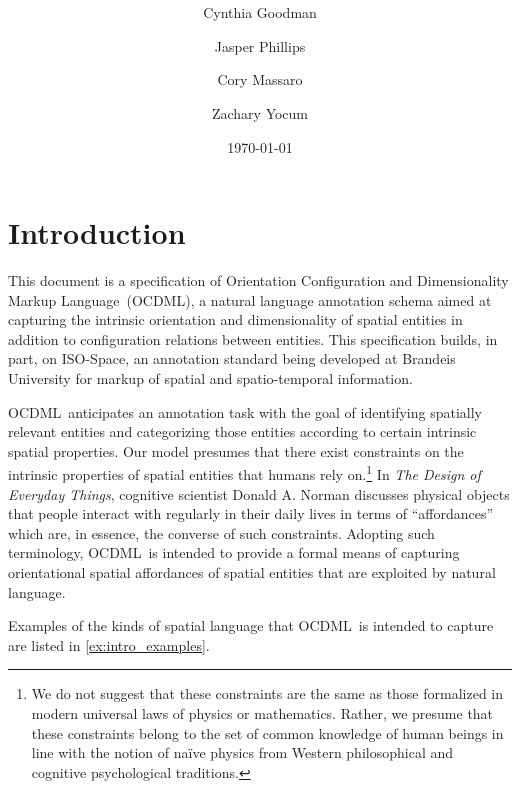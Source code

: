 \documentclass[11pt]{article}
\title{\nameML\\
{\Large \version}}
\author{
    Cynthia Goodman\\
    \and
    Jasper Phillips\\
    \and
    Cory Massaro\\
    \and
    Zachary Yocum\\
}
\date{\today}
\newcommand{\nameML}{Orientation Configuration and Dimensionality Markup Language}
\newcommand{\ML}{OCDML}
\begin{document}
\maketitle

\tableofcontents 

\newpage

\section{Introduction} %
\label{sec:introduction}

This document is a specification of \nameML~(\ML), a natural language annotation schema aimed at capturing the intrinsic orientation and dimensionality of spatial entities in addition to configuration relations between entities. This specification builds, in part, on ISO-Space\cite{pustejovsky_moszkowicz:2011}, an annotation standard being developed at Brandeis University for markup of spatial and spatio-temporal information.

\ML~anticipates an annotation task with the goal of identifying spatially relevant entities and categorizing those entities according to certain intrinsic spatial properties. Our model presumes that there exist constraints on the intrinsic properties of spatial entities that humans rely on.\footnote{We do not suggest that these constraints are the same as those formalized in modern universal laws of physics or mathematics. Rather, we presume that these constraints belong to the set of common knowledge of human beings in line with the notion of na\"ive physics from Western philosophical and cognitive psychological traditions.} In \emph{The Design of Everyday Things}\cite{norman:2002}, cognitive scientist Donald A. Norman discusses physical objects that people interact with regularly in their daily lives in terms of ``affordances'' which are, in essence, the converse of such constraints. Adopting such terminology, \ML~is intended to provide a formal means of capturing orientational spatial affordances of spatial entities that are exploited by natural language.

Examples of the kinds of spatial language that \ML~is intended to capture are listed in \cref{ex:intro_examples}.

\label{ex:intro_examples}
\end{document}
